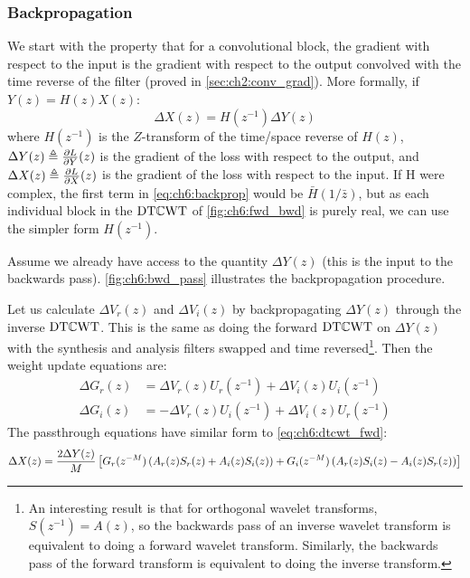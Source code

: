 \subsubsection{Backpropagation}\label{sec:ch6:dtcwt_update}

We start with the property that for a convolutional block, the
gradient with respect to the input is the gradient with respect to the output
convolved with the time reverse of the filter (proved in \autoref{sec:ch2:conv_grad}).
More formally, if $Y(z) = H(z) X(z)$:
%
\begin{equation}\label{eq:ch6:backprop}
  \Delta X(z) = H(z^{-1}) \Delta Y(z)
\end{equation}
%
where $H(z^{-1})$ is the $Z$-transform of the time/space reverse of $H(z)$,
$\Delta Y(z) \triangleq \frac{\partial L}{\partial Y}(z)$ is the gradient of the loss with respect
to the output, and $\Delta X(z) \triangleq \frac{\partial L}{\partial X}(z)$ is the gradient of
the loss with respect to the input. 
If H were complex, the first term in \autoref{eq:ch6:backprop} would be
$\bar{H}(1/\bar{z})$, but as each individual block in the $\mathrm{DT}\mathbb{C}\mathrm{WT}$ of
\autoref{fig:ch6:fwd_bwd} is purely real, we can use the simpler form $H(z^{-1})$. 

Assume we already have access to the quantity $\Delta Y(z)$ (this is the input
to the backwards pass). \autoref{fig:ch6:bwd_pass} illustrates the
backpropagation procedure.

Let us calculate $\Delta V_r(z)$ and $\Delta V_i(z)$ by backpropagating
$\Delta Y(z)$ through the inverse $\mathrm{DT}\mathbb{C}\mathrm{WT}$. This is the same as doing the
forward $\mathrm{DT}\mathbb{C}\mathrm{WT}$ on $\Delta Y(z)$ with the synthesis and analysis filters
swapped and time reversed\footnote{An interesting result is that for orthogonal wavelet
transforms, $S(z^{-1}) = A(z)$, so the backwards pass of an inverse wavelet
transform is equivalent to doing a forward wavelet transform. Similarly, the
backwards pass of the forward transform is equivalent to doing the inverse
transform.}. Then the weight update equations are:
\begin{align}
  \Delta G_r(z) &= \Delta V_r(z) U_r(z^{-1}) + \Delta V_i(z) U_i(z^{-1})  \label{eq:ch6:gr_update}\\
  \Delta G_i(z) &=  -\Delta V_r(z) U_i(z^{-1}) + \Delta V_i(z) U_r(z^{-1})  \label{eq:ch6:gi_update} 
\end{align}
%
The passthrough equations have similar form to \eqref{eq:ch6:dtcwt_fwd}:
\begin{equation}\label{eq:ch6:dtcwt_passthrough}
    \Delta X(z) = \frac{2\Delta Y(z)}{M} \left[G_r(z^{-M})\left( A_r(z)S_r(z) + A_i(z)S_i(z) \right) + \\
       G_i(z^{-M}) \left(A_r(z)S_i(z) - A_i(z)S_r(z) \right) \right] 
\end{equation}

